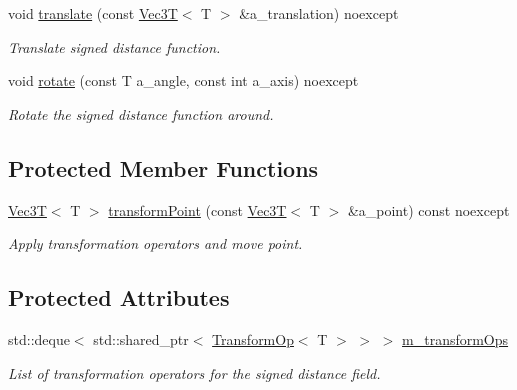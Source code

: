 \begin{DoxyCompactItemize}
void \hyperlink{classSignedDistanceFunction_add71ebc2e7f3fb5e85766898413482e7}{translate} (const \hyperlink{classVec3T}{Vec3T}$<$ T $>$ \&a\+\_\+translation) noexcept
\begin{DoxyCompactList}\small\item\em Translate signed distance function. \end{DoxyCompactList}\item 
void \hyperlink{classSignedDistanceFunction_ae8de697f4d0966290342bcf6383585ef}{rotate} (const T a\+\_\+angle, const int a\+\_\+axis) noexcept
\begin{DoxyCompactList}\small\item\em Rotate the signed distance function around. \end{DoxyCompactList}\end{DoxyCompactItemize}
\subsection*{Protected Member Functions}
\begin{DoxyCompactItemize}
\item 
\mbox{\label{classSignedDistanceFunction_af186f98f9ea4ac96fccb4add4ebf196d}} 
\hyperlink{classVec3T}{Vec3T}$<$ T $>$ \hyperlink{classSignedDistanceFunction_af186f98f9ea4ac96fccb4add4ebf196d}{transform\+Point} (const \hyperlink{classVec3T}{Vec3T}$<$ T $>$ \&a\+\_\+point) const noexcept
\begin{DoxyCompactList}\small\item\em Apply transformation operators and move point. \end{DoxyCompactList}\end{DoxyCompactItemize}
\subsection*{Protected Attributes}
\begin{DoxyCompactItemize}
\item 
\mbox{\label{classSignedDistanceFunction_af61e5e2ece6add9d2bcf8e5aa8cf2844}} 
std\+::deque$<$ std\+::shared\+\_\+ptr$<$ \hyperlink{classTransformOp}{Transform\+Op}$<$ T $>$ $>$ $>$ \hyperlink{classSignedDistanceFunction_af61e5e2ece6add9d2bcf8e5aa8cf2844}{m\+\_\+transform\+Ops}
\begin{DoxyCompactList}\small\item\em List of transformation operators for the signed distance field. \end{DoxyCompactList}\end{DoxyCompactItemize}


